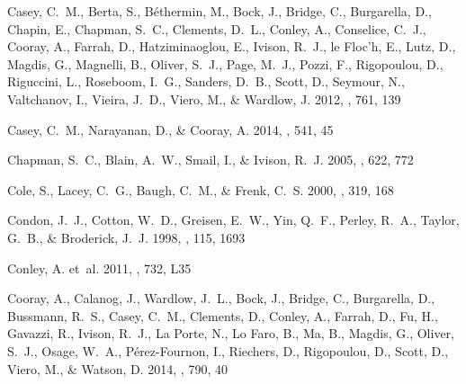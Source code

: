 \documentclass[iop]{emulateapj}
\begin{document}
\begin{thebibliography}{107}
{Casey}, C.~M., {Berta}, S., {B{\'e}thermin}, M., {Bock}, J., {Bridge}, C.,
  {Burgarella}, D., {Chapin}, E., {Chapman}, S.~C., {Clements}, D.~L.,
  {Conley}, A., {Conselice}, C.~J., {Cooray}, A., {Farrah}, D.,
  {Hatziminaoglou}, E., {Ivison}, R.~J., {le Floc'h}, E., {Lutz}, D., {Magdis},
  G., {Magnelli}, B., {Oliver}, S.~J., {Page}, M.~J., {Pozzi}, F.,
  {Rigopoulou}, D., {Riguccini}, L., {Roseboom}, I.~G., {Sanders}, D.~B.,
  {Scott}, D., {Seymour}, N., {Valtchanov}, I., {Vieira}, J.~D., {Viero}, M.,
  \& {Wardlow}, J. 2012{}, \apj, 761, 139

{Casey}, C.~M., {Narayanan}, D., \& {Cooray}, A. 2014, \physrep, 541, 45

{Chapman}, S.~C., {Blain}, A.~W., {Smail}, I., \& {Ivison}, R.~J. 2005, \apj,
  622, 772

{Cole}, S., {Lacey}, C.~G., {Baugh}, C.~M., \& {Frenk}, C.~S. 2000, \mnras,
  319, 168

{Condon}, J.~J., {Cotton}, W.~D., {Greisen}, E.~W., {Yin}, Q.~F., {Perley},
  R.~A., {Taylor}, G.~B., \& {Broderick}, J.~J. 1998, \aj, 115, 1693

{Conley}, A. {et~al.} 2011, \apjl, 732, L35

{Cooray}, A., {Calanog}, J., {Wardlow}, J.~L., {Bock}, J., {Bridge}, C.,
  {Burgarella}, D., {Bussmann}, R.~S., {Casey}, C.~M., {Clements}, D.,
  {Conley}, A., {Farrah}, D., {Fu}, H., {Gavazzi}, R., {Ivison}, R.~J., {La
  Porte}, N., {Lo Faro}, B., {Ma}, B., {Magdis}, G., {Oliver}, S.~J., {Osage},
  W.~A., {P{\'e}rez-Fournon}, I., {Riechers}, D., {Rigopoulou}, D., {Scott},
  D., {Viero}, M., \& {Watson}, D. 2014, \apj, 790, 40


\end{thebibliography}
\end{document}
